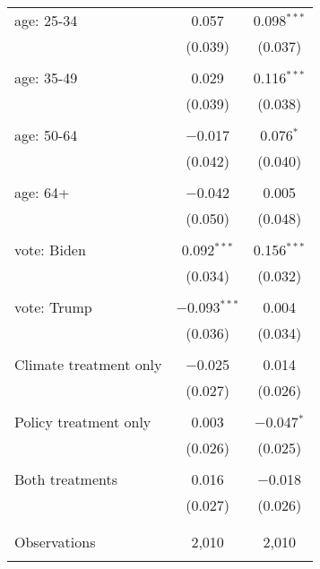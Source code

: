 \begin{tabular}{@{\extracolsep{5pt}}lcc}
 age: 25-34 & 0.057 & 0.098$^{***}$ \\ 
  & (0.039) & (0.037) \\ 
  & & \\ 
 age: 35-49 & 0.029 & 0.116$^{***}$ \\ 
  & (0.039) & (0.038) \\ 
  & & \\ 
 age: 50-64 & $-$0.017 & 0.076$^{*}$ \\ 
  & (0.042) & (0.040) \\ 
  & & \\ 
 age: 64+ & $-$0.042 & 0.005 \\ 
  & (0.050) & (0.048) \\ 
  & & \\ 
 vote: Biden & 0.092$^{***}$ & 0.156$^{***}$ \\ 
  & (0.034) & (0.032) \\ 
  & & \\ 
 vote: Trump & $-$0.093$^{***}$ & 0.004 \\ 
  & (0.036) & (0.034) \\ 
  & & \\ 
 Climate treatment only & $-$0.025 & 0.014 \\ 
  & (0.027) & (0.026) \\ 
  & & \\ 
 Policy treatment only & 0.003 & $-$0.047$^{*}$ \\ 
  & (0.026) & (0.025) \\ 
  & & \\ 
 Both treatments & 0.016 & $-$0.018 \\ 
  & (0.027) & (0.026) \\ 
  & & \\ 
\hline \\[-1.8ex] 

Observations & 2,010 & 2,010 \\ 
\hline 
\hline \\[-1.8ex] 
\end{tabular} 